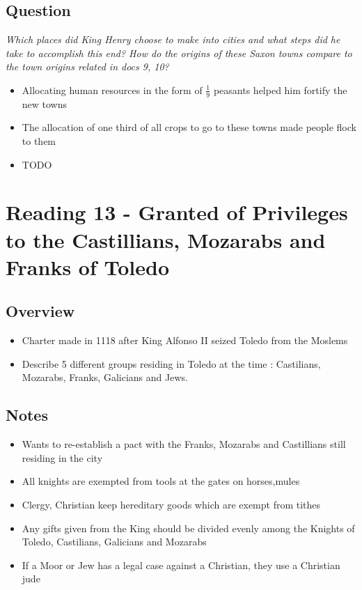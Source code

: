 \documentclass[12pt]{article}
\begin{document}
{\subsection*{Question}

\textit{Which places did King Henry choose to make into cities and what steps did he take to accomplish this end? How do the origins of these Saxon towns compare to the town origins related in docs 9, 10?}

\begin{itemize}
	\item Allocating human resources in the form of $\frac{1}{9}$ peasants helped him fortify the new towns
	\item The allocation of one third of all crops to go to these towns made people flock to them
	\item TODO
\end{itemize}

\section*{Reading 13 - Granted of Privileges to the Castillians, Mozarabs and Franks of Toledo}

\subsection*{Overview}

\begin{itemize}
	\item Charter made in 1118 after King Alfonso II seized Toledo from the Moslems
	\item Describe 5 different groups residing in Toledo at the time : Castilians, Mozarabs, Franks, Galicians and Jews.
\end{itemize}

\subsection*{Notes}

\begin{itemize}
	\item Wants to re-establish a pact with the Franks, Mozarabs and Castillians still residing in the city
	\item All knights are exempted from tools at the gates on horses,mules
	\item Clergy, Christian keep hereditary goods which are exempt from tithes
	\item Any gifts given from the King should be divided evenly among the Knights of Toledo, Castilians, Galicians and Mozarabs
	\item If a Moor or Jew has a legal case against a Christian, they use a Christian jude
\end{itemize}

}
\end{document}
